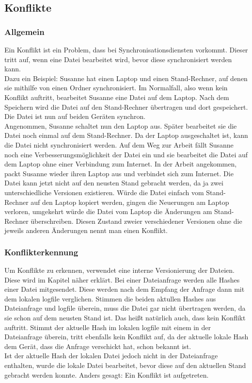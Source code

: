 \subsection{Konflikte}\label{Konflikt}
\subsubsection{Allgemein}
Ein Konflikt ist ein Problem, dass bei Synchronisationsdiensten vorkommt. Dieser tritt auf, wenn eine Datei bearbeitet wird, bevor diese synchronisiert werden kann. \\
Dazu ein Beispiel: Susanne hat einen Laptop und einen Stand-Rechner, auf denen sie mithilfe von \sblit einen Ordner synchronisiert. Im Normalfall, also wenn kein Konflikt auftritt, bearbeitet Susanne eine Datei auf dem Laptop. Nach dem Speichern wird die Datei auf den Stand-Rechner übertragen und dort gespeichert. Die Datei ist nun auf beiden Geräten synchron.\\
Angenommen, Susanne schaltet nun den Laptop aus. Später bearbeitet sie die Datei noch einmal auf dem Stand-Rechner. Da der Laptop ausgeschaltet ist, kann die Datei nicht synchronisiert werden. Auf dem Weg zur Arbeit fällt Susanne noch eine Verbesserungsmöglichkeit der Datei ein und sie bearbeitet die Datei auf dem Laptop ohne einer Verbindung zum Internet. In der Arbeit angekommen, packt Susanne wieder ihren Laptop aus und verbindet sich zum Internet. Die Datei kann jetzt nicht auf den neusten Stand gebracht werden, da ja zwei unterschiedliche Versionen existieren. Würde die Datei einfach vom Stand-Rechner auf den Laptop kopiert werden, gingen die Neuerungen am Laptop verloren, umgekehrt würde die Datei vom Laptop die Änderungen am Stand-Rechner überschreiben. Diesen Zustand zweier verschiedener Versionen ohne die jeweils anderen Änderungen nennt man einen Konflikt.

\subsubsection{Konflikterkennung}\label{Konflikterkennung}
Um Konflikte zu erkennen, verwendet \sblit eine interne Versionierung der Dateien. Diese wird im Kapitel  näher erklärt. Bei einer Dateianfrage  werden alle Hashes einer Datei mitgesendet. Diese werden nach dem Empfang der Anfrage dann mit dem lokalen \gls{logfile} verglichen. Stimmen die beiden aktullen Hashes aus Dateianfrage und \gls{logfile} überein, muss die Datei gar nicht übertragen werden, da sie schon auf dem neusten Stand ist. Das heißt natürlich auch, dass kein Konflikt auftritt. Stimmt der aktuelle Hash im lokalen \gls{logfile} mit einem in der Dateianfrage überein, tritt ebenfalls kein Konflikt auf, da der aktuelle lokale Hash dem Gerät, dass die Anfrage verschickt hat, schon bekannt ist. \\
Ist der aktuelle Hash der lokalen Datei jedoch nicht in der Dateianfrage enthalten, wurde die lokale Datei bearbeitet, bevor diese auf den aktuellen Stand gebracht werden konnte. Anders gesagt: Ein Konflikt ist aufgetreten.

